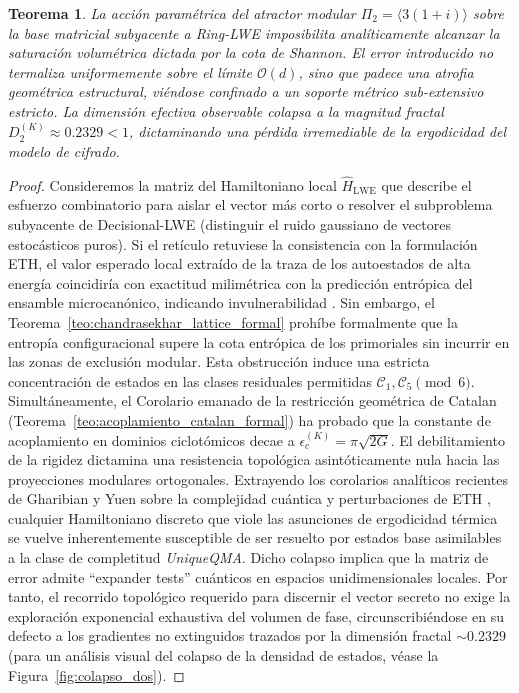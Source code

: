 \documentclass{article}
\numberwithin{equation}{section}
\theoremstyle{plain}
\newtheorem{teorema}{Teorema}[section]
\theoremstyle{definition}
\begin{document}
\begin{teorema}
\label{teo:violacion_eth_lwe_uniqueqma}
La acción paramétrica del atractor modular $\Pi_2 = \langle 3(1+i) \rangle$ sobre la base matricial subyacente a Ring-LWE imposibilita analíticamente alcanzar la saturación volumétrica dictada por la cota de Shannon. El error introducido no termaliza uniformemente sobre el límite $\mathcal{O}(d)$, sino que padece una atrofia geométrica estructural, viéndose confinado a un soporte métrico sub-extensivo estricto. La dimensión efectiva observable colapsa a la magnitud fractal $D_2^{(K)} \approx 0.2329 < 1$, dictaminando una pérdida irremediable de la ergodicidad del modelo de cifrado.
\end{teorema}

\begin{proof}
Consideremos la matriz del Hamiltoniano local $\hat{H}_{\text{LWE}}$ que describe el esfuerzo combinatorio para aislar el vector más corto o resolver el subproblema subyacente de Decisional-LWE (distinguir el ruido gaussiano de vectores estocásticos puros). Si el retículo retuviese la consistencia con la formulación ETH, el valor esperado local extraído de la traza de los autoestados de alta energía coincidiría con exactitud milimétrica con la predicción entrópica del ensamble microcanónico, indicando invulnerabilidad \cite{Pappalardi2023ETH}. 
Sin embargo, el Teorema~\ref{teo:chandrasekhar_lattice_formal} prohíbe formalmente que la entropía configuracional supere la cota entrópica de los primoriales sin incurrir en las zonas de exclusión modular. Esta obstrucción induce una estricta concentración de estados en las clases residuales permitidas $\mathcal{C}_1, \mathcal{C}_5 \pmod 6$.
Simultáneamente, el Corolario emanado de la restricción geométrica de Catalan (Teorema~\ref{teo:acoplamiento_catalan_formal}) ha probado que la constante de acoplamiento en dominios ciclotómicos decae a $\epsilon_c^{(K)} = \pi\sqrt{2G}$. El debilitamiento de la rigidez dictamina una resistencia topológica asintóticamente nula hacia las proyecciones modulares ortogonales. 
Extrayendo los corolarios analíticos recientes de Gharibian y Yuen sobre la complejidad cuántica y perturbaciones de ETH \cite{Gharibian2024UniqueQMA}, cualquier Hamiltoniano discreto que viole las asunciones de ergodicidad térmica se vuelve inherentemente susceptible de ser resuelto por estados base asimilables a la clase de completitud \textit{UniqueQMA}. 
Dicho colapso implica que la matriz de error admite ``expander tests'' cuánticos en espacios unidimensionales locales. Por tanto, el recorrido topológico requerido para discernir el vector secreto no exige la exploración exponencial exhaustiva del volumen de fase, circunscribiéndose en su defecto a los gradientes no extinguidos trazados por la dimensión fractal $\sim 0.2329$ (para un análisis visual del colapso de la densidad de estados, véase la Figura~\ref{fig:colapso_dos}).
\end{proof}
\end{document}

